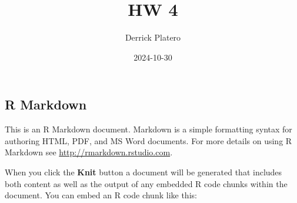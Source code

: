 \documentclass[
]{article}
\title{HW 4}
\author{Derrick Platero}
\date{2024-10-30}
\begin{document}
\maketitle

\subsection{R Markdown}\label{r-markdown}

This is an R Markdown document. Markdown is a simple formatting syntax
for authoring HTML, PDF, and MS Word documents. For more details on
using R Markdown see \url{http://rmarkdown.rstudio.com}.

When you click the \textbf{Knit} button a document will be generated
that includes both content as well as the output of any embedded R code
chunks within the document. You can embed an R code chunk like this:
\end{document}

